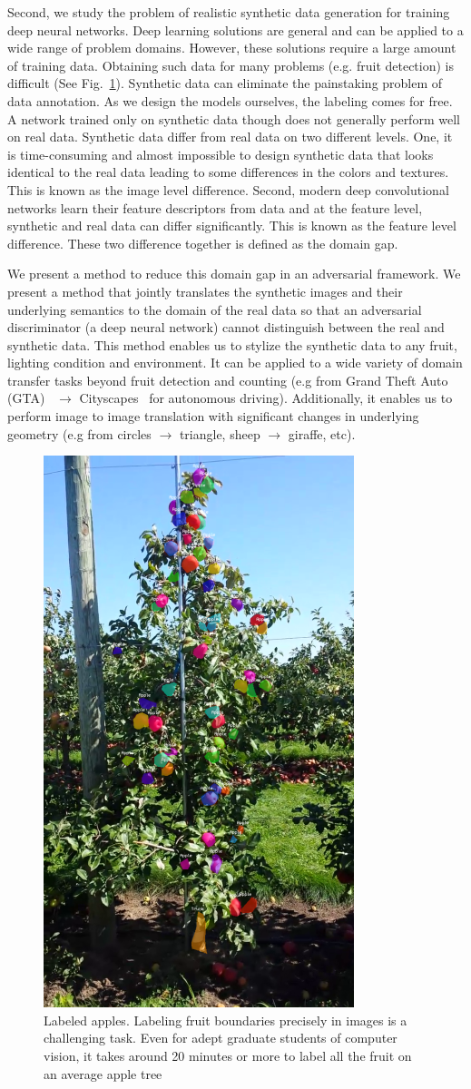 Second, we study the problem of realistic synthetic data generation for training deep neural networks. Deep learning solutions are general and can be applied to a wide range of problem domains. However, these solutions require a large amount of training data. Obtaining such data for many problems (e.g. fruit detection) is difficult (See Fig.~\ref{fig:labeled_instance}). Synthetic data can eliminate the painstaking problem of data annotation. As we design the models ourselves, the labeling comes for free. A network trained only on synthetic data though does not generally perform well on real data. Synthetic data differ from real data on two different levels. One, it is time-consuming and almost impossible to design synthetic data that looks identical to the real data leading to some differences in the colors and textures. This is known as the image level difference. Second, modern deep convolutional networks learn their feature descriptors from data and at the feature level, synthetic and real data can differ significantly. This is known as the feature level difference. These two difference together is defined as the domain gap. 

We present a method to reduce this domain gap in an adversarial framework. We present a method that jointly translates the synthetic images and their underlying semantics to the domain of the real data so that an adversarial discriminator (a deep neural network) cannot distinguish between the real and synthetic data. This method enables us to stylize the synthetic data to any fruit, lighting condition and environment. It can be applied to a wide variety of domain transfer tasks beyond fruit detection and counting (e.g from Grand Theft Auto (GTA)~\cite{gta} $\to$ Cityscapes~\cite{cordts_cityscapes_2016} for autonomous driving).  Additionally, it enables us to perform image to image translation with significant changes in underlying geometry (e.g from circles $\to$ triangle, sheep $\to$ giraffe, etc).


\begin{figure}[!hbpt]
{\centering
\includegraphics[width=0.25\columnwidth]{figures/prelim/instance.png}
\caption[Annotated  fruit boundaries.]{
Labeled apples. Labeling fruit boundaries precisely in images is a challenging task. Even for adept graduate students of computer vision, it takes around 20 minutes or more to label all the fruit on an average apple tree \label{fig:labeled_instance}}
}
\end{figure}


